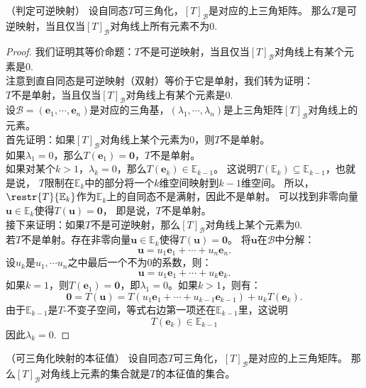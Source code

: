 \documentclass[12pt,UTF8,fontset=none]{ctexbook}
\begin{document}
\begin{pp}（判定可逆映射）\label{pp:6_6}
    设自同态$T$可三角化，$[T]_\mathcal{B}$是对应的上三角矩阵。
    那么$T$是可逆映射，当且仅当$[T]_\mathcal{B}$对角线上所有元素不为0.
\end{pp}
\begin{proof} %
    我们证明其等价命题：$T$不是可逆映射，当且仅当$[T]_\mathcal{B}$对角线上有某个元素是0.\\
    注意到直自同态是可逆映射（双射）等价于它是单射，我们转为证明：\\
    $T$不是单射，当且仅当$[T]_\mathcal{B}$对角线上有某个元素是0.\\
    设$\mathcal{B} = (\mathbf{e}_1, \cdots , \mathbf{e}_n)$是对应的三角基，$(\lambda_1, \cdots , \lambda_n)$是上三角矩阵$[T]_\mathcal{B}$对角线上的元素。\\
    首先证明：如果$[T]_\mathcal{B}$对角线上某个元素为0，则$T$不是单射。\\
    如果$\lambda_1 = 0$，那么$T(\mathbf{e}_1) = \mathbf{0}$，$T$不是单射。\\
    如果对某个$k>1$，$\lambda_k = 0$，那么$T(\mathbf{e}_k) \in \mathbb{E}_{k-1}$。
    这说明$T(\mathbb{E}_k) \subseteq \mathbb{E}_{k-1}$，也就是说，
    $T$限制在$\mathbb{E}_k$中的部分将一个$k$维空间映射到$k-1$维空间。
    所以，$\restr{T}{\mathbb{E}_k}$作为$\mathbb{E}_k$上的自同态不是满射，因此不是单射。
    可以找到非零向量$\mathbf{u} \in \mathbb{E}_k$使得$T(\mathbf{u}) = \mathbf{0}$，
    即是说，$T$不是单射。\\
    接下来证明：如果$T$不是可逆映射，那么$[T]_\mathcal{B}$对角线上某个元素为0.\\
    若$T$不是单射。存在非零向量$\mathbf{u} \in \mathbb{E}_k$使得$T(\mathbf{u}) = \mathbf{0}$。
    将$\mathbf{u}$在$\mathcal{B}$中分解：
    $$ \mathbf{u} = u_1 \mathbf{e}_1 + \cdots + u_n \mathbf{e}_n.$$
    设$u_k$是$u_1, \cdots u_n$之中最后一个不为0的系数，则：
    $$ \mathbf{u} = u_1 \mathbf{e}_1 + \cdots + u_k \mathbf{e}_k.$$
    如果$k=1$，则$T(\mathbf{e}_1) = \mathbf{0}$，即$\lambda_1 = 0$。如果$k > 1$，则有：
    $$ \mathbf{0} = T(\mathbf{u}) = T(u_1 \mathbf{e}_1 + \cdots + u_{k-1} \mathbf{e}_{k-1}) +  u_k T(\mathbf{e}_k).$$
    由于$\mathbb{E}_{k-1}$是$T$-不变子空间，等式右边第一项还在$\mathbb{E}_{k-1}$里，这说明
    $$ T(\mathbf{e}_k) \in \mathbb{E}_{k-1}$$
    因此$\lambda_k = 0.$

\end{proof}


\begin{pp}（可三角化映射的本征值）\label{pp:6_7}
    设自同态$T$可三角化，$[T]_\mathcal{B}$是对应的上三角矩阵。
    那么$[T]_\mathcal{B}$对角线上元素的集合就是$T$的本征值的集合。
\end{pp}
\end{document}
